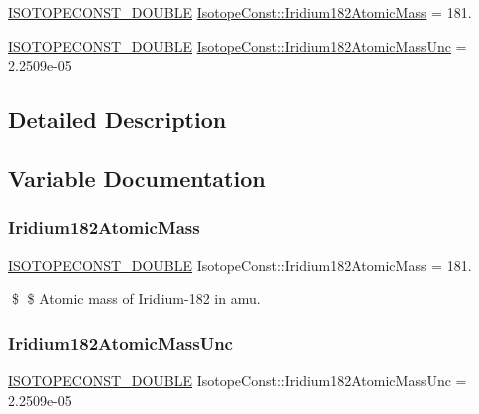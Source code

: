 \begin{DoxyCompactItemize}
\item 
\mbox{\hyperlink{group___isotope_const-_macros_ga8f45a7272ce02c0b4c65c44636ed719a}{I\+S\+O\+T\+O\+P\+E\+C\+O\+N\+S\+T\+\_\+\+D\+O\+U\+B\+LE}} \mbox{\hyperlink{group___isotope_const-_iridium-_ir182_gafc758c58bad940bb0e5df5cc866524c7}{Isotope\+Const\+::\+Iridium182\+Atomic\+Mass}} = 181.
\item 
\mbox{\hyperlink{group___isotope_const-_macros_ga8f45a7272ce02c0b4c65c44636ed719a}{I\+S\+O\+T\+O\+P\+E\+C\+O\+N\+S\+T\+\_\+\+D\+O\+U\+B\+LE}} \mbox{\hyperlink{group___isotope_const-_iridium-_ir182_ga3b3762bed3d0f7a480bed352d1506914}{Isotope\+Const\+::\+Iridium182\+Atomic\+Mass\+Unc}} = 2.\+2509e-\/05
\end{DoxyCompactItemize}


\subsection{Detailed Description}


\subsection{Variable Documentation}
\mbox{\label{group___isotope_const-_iridium-_ir182_gafc758c58bad940bb0e5df5cc866524c7}} 
\subsubsection{\texorpdfstring{Iridium182\+Atomic\+Mass}{Iridium182AtomicMass}}
{\footnotesize\ttfamily \mbox{\hyperlink{group___isotope_const-_macros_ga8f45a7272ce02c0b4c65c44636ed719a}{I\+S\+O\+T\+O\+P\+E\+C\+O\+N\+S\+T\+\_\+\+D\+O\+U\+B\+LE}} Isotope\+Const\+::\+Iridium182\+Atomic\+Mass = 181.}

\$ \$ Atomic mass of Iridium-\/182 in amu. \mbox{\label{group___isotope_const-_iridium-_ir182_ga3b3762bed3d0f7a480bed352d1506914}} 
\subsubsection{\texorpdfstring{Iridium182\+Atomic\+Mass\+Unc}{Iridium182AtomicMassUnc}}
{\footnotesize\ttfamily \mbox{\hyperlink{group___isotope_const-_macros_ga8f45a7272ce02c0b4c65c44636ed719a}{I\+S\+O\+T\+O\+P\+E\+C\+O\+N\+S\+T\+\_\+\+D\+O\+U\+B\+LE}} Isotope\+Const\+::\+Iridium182\+Atomic\+Mass\+Unc = 2.\+2509e-\/05}

